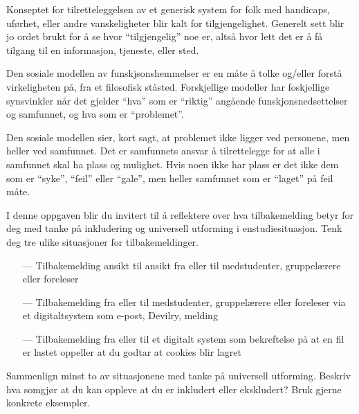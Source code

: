 \documentclass{../../myassignment}
\begin{document}
\begin{answer}
\begin{description}[style=nextline]
			\item [Tilgjengelighet] Konseptet for tilretteleggelsen av et generisk system for folk med handicaps, uførhet, eller andre vanskeligheter blir kalt for tilgjengelighet. Generelt sett blir jo ordet brukt for å se hvor ``tilgjengelig'' noe er, altså hvor lett det er å få tilgang til en informasjon, tjeneste, eller sted.

			\item [Sosial modell] Den sosiale modellen av funskjsonshemmelser er en måte å tolke og/eller forstå virkeligheten på, fra et filosofisk ståsted. Forskjellige modeller har foskjellige synsvinkler når det gjelder ``hva'' som er ``riktig'' angående funskjonsnedsettelser og samfunnet, og hva som er ``problemet''. 

			Den sosiale modellen sier, kort sagt, at problemet ikke ligger ved personene, men heller ved samfunnet. Det er samfunnets ansvar å tilrettelegge for at alle i samfunnet skal ha plass og mulighet. Hvis noen ikke har plass er det ikke dem som er ``syke'', ``feil'' eller ``gale'', men heller samfunnet som er ``laget'' på feil måte.

		\end{description}
	\end{answer}

	\newpage

	\begin{problem}
		I denne oppgaven blir du invitert til å reflektere over hva tilbakemelding betyr for deg med tanke på inkludering og universell utforming i enstudiesituasjon. Tenk deg tre ulike situasjoner for tilbakemeldinger.

		\begin{itemize}
			\item[---] Tilbakemelding ansikt til ansikt fra eller til medstudenter, gruppelærere eller foreleser
			\item[---] Tilbakemelding fra eller til medstudenter, gruppelærere eller foreleser via et digitaltsystem som e-post, Devilry, melding
			\item[---] Tilbakemelding fra eller til et digitalt system som bekreftelse på at en fil er lastet oppeller at du godtar at cookies blir lagret
		\end{itemize}
		Sammenlign minst to av situasjonene med tanke på universell utforming. Beskriv hva somgjør at du kan oppleve at du er inkludert eller ekskludert? Bruk gjerne konkrete eksempler.
	\end{problem}
\end{document}
